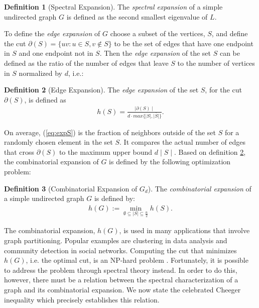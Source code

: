 \documentclass{amsart}
\theoremstyle{definition}
\newtheorem{definition}{Definition}
\theoremstyle{remark}
\numberwithin{equation}{section}
\begin{document}
\begin{definition}[Spectral Expansion] \label{def:specexp}
The \textit{spectral expansion} of a simple undirected graph $G$ is defined as the second smallest eigenvalue of $L$. 
\end{definition}
To define the \textit{edge expansion} of $G$ choose a subset of the vertices, $S$, and define the cut $\partial(S)=\{uv: u\in S, v \not\in S\}$ to be the set of edges that have one endpoint in $S$ and one endpoint not in $S$. Then the \textit{edge expansion} of the set $S$ can be defined as the ratio of the number of edges that leave $S$ to the number of vertices in $S$ normalized by $d$, i.e.:
\begin{definition}[Edge Expansion]\label{def:edgeexp}
The \textit{edge expansion} of the set $S$, for the cut $\partial (S)$, is defined as
\begin{align}\label{eq:expS} 
h(S) = \frac{\mid \partial(S)\mid}{d\cdot max\{\mid S \mid,\mid \bar{S}\mid\}}.
\end{align}
\end{definition}
On average, (\ref{eq:expS}) is the fraction of neighbors outside of the set $S$ for a randomly chosen element in the set $S$. It compares the actual number of edges that cross $\partial (S)$ to the maximum upper bound $d \mid S \mid$. Based on definition \ref{def:edgeexp}, the combinatorial expansion of $G$ is defined by the following optimization problem:
\begin{definition}[Combinatorial Expansion of $G_d$] \label{def:combexp} The \textit{combinatorial expansion} of a simple undirected graph $G$ is defined by: 
\begin{align} \label{eq:expG}
h(G) := \min_{\emptyset \subseteq \mid S \mid  \subseteq \frac{n}{2}} h(S).
\end{align}
\end{definition}
The combinatorial expansion, $h(G)$, is used in many applications that involve graph partitioning. Popular examples are clustering in data analysis and community detection in social networks. Computing the cut that minimizes $h(G)$, i.e. the optimal cut, is an NP-hard problem \cite{Garey1990}. Fortunately, it is possible to address the problem through spectral theory instead. In order to do this, however, there must be a relation between the spectral characterization of a graph and its combinatorial expansion. We now state the celebrated Cheeger inequality which precisely establishes this relation.
\end{document}
